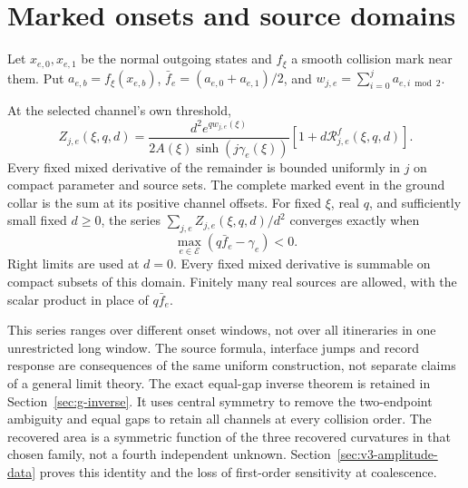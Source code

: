 \section{Marked onsets and source domains}\label{sec:v8-marked}
Let $x_{e,0},x_{e,1}$ be the normal outgoing states and $f_\xi$ a smooth
collision mark near them. Put $a_{e,b}=f_\xi(x_{e,b})$,
$\bar f_e=(a_{e,0}+a_{e,1})/2$, and
$w_{j,e}=\sum_{i=0}^j a_{e,i\bmod2}$.
\begin{theorem}
\label{thm:g-marked}
At the selected channel's own threshold,
\begin{equation}\label{eq:g-marked}
 Z_{j,e}(\xi,q,d)=
 \frac{d^2e^{qw_{j,e}(\xi)}}{2A(\xi)\sinh(j\gamma_e(\xi))}
       [1+d\mathcal R^f_{j,e}(\xi,q,d)].
\end{equation}
Every fixed mixed derivative of the remainder is bounded uniformly in
$j$ on compact parameter and source sets. The complete marked event in
the ground collar is the sum at its positive channel offsets. For fixed
$\xi$, real $q$, and sufficiently small fixed $d\ge0$, the series
$\sum_{j,e}Z_{j,e}(\xi,q,d)/d^2$ converges exactly when
\begin{equation}\label{eq:g-source-domain}
           \max_{e\in\mathcal E}(q\bar f_e-\gamma_e)<0.
\end{equation}
Right limits are used at $d=0$. Every fixed mixed derivative is summable
on compact subsets of this domain. Finitely many real sources are
allowed, with the scalar product in place of $q\bar f_e$.
\end{theorem}

This series ranges over different onset windows, not over all
itineraries in one unrestricted long window. The source formula,
interface jumps and record response are consequences of the same
uniform construction, not separate claims of a general limit theory.
The exact equal-gap inverse theorem is retained in
Section~\ref{sec:g-inverse}. It uses central symmetry to remove the
two-endpoint ambiguity and equal gaps to retain all channels at every
collision order. The recovered area is a symmetric function of the
three recovered curvatures in that chosen family, not a fourth
independent unknown. Section~\ref{sec:v3-amplitude-data} proves this
identity and the loss of first-order sensitivity at coalescence.

